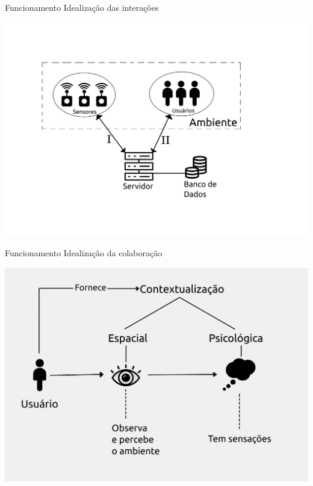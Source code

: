 \documentclass{beamer}
\begin{document}
  \begin{frame}{Funcionamento}
    Idealização das interações
    \begin{center}
    \includegraphics[scale=0.7]{solucao1}
    \end{center}
  \end{frame}
  \begin{frame}{Funcionamento}
    Idealização da colaboração
    \begin{center}
    \includegraphics[scale=0.7]{solucao2}
    \end{center}
  \end{frame}
\end{document}
